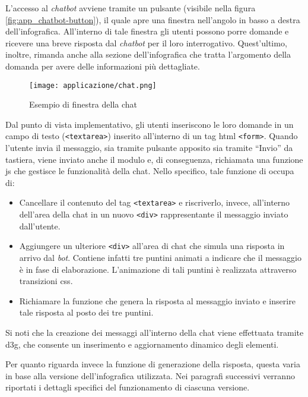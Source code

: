 L'accesso al \emph{chatbot} avviene tramite un pulsante (visibile nella figura \ref{fig:app_chatbot-button}), il quale apre una finestra nell'angolo in basso a destra dell'infografica. 
All'interno di tale finestra gli utenti possono porre domande e ricevere una breve risposta dal \emph{chatbot} per il loro interrogativo. Quest'ultimo, inoltre, rimanda anche alla sezione 
dell'infografica che tratta l'argomento della domanda per avere delle informazioni più dettagliate.
\begin{figure}[H] 
    \centering 
    \texttt{[image: applicazione/chat.png]} 
    \caption{Esempio di finestra della chat}
    \label{fig:app_chat}
\end{figure}

Dal punto di vista implementativo, gli utenti inseriscono le loro domande in un campo di testo (\texttt{<textarea>}) inserito all'interno di un tag \gls{html} \texttt{<form>}. 
Quando l'utente invia il messaggio, sia tramite pulsante apposito sia tramite ``Invio'' da tastiera, 
viene inviato anche il modulo e, di conseguenza, richiamata una funzione \gls{js} che gestisce le funzionalità della chat.
Nello specifico, tale funzione di occupa di:
\begin{itemize}
    \item Cancellare il contenuto del tag \texttt{<textarea>} e riscriverlo, invece, all'interno dell'area della chat in un nuovo \texttt{<div>} rappresentante il 
    messaggio inviato dall'utente.
    \item Aggiungere un ulteriore \texttt{<div>} all'area di chat che simula una risposta in arrivo dal \emph{bot}. Contiene infatti tre puntini animati a indicare che il messaggio è in fase 
    di elaborazione. L'animazione di tali puntini è realizzata attraverso transizioni \gls{css}.
    \item Richiamare la funzione che genera la risposta al messaggio inviato e inserire tale risposta al posto dei tre puntini.
\end{itemize}
Si noti che la creazione dei messaggi all'interno della chat viene effettuata tramite \gls{d3g}, che consente un inserimento e aggiornamento dinamico degli elementi. 

Per quanto riguarda invece la funzione di generazione della risposta, questa varia in base alla versione dell'infografica utilizzata. Nei paragrafi successivi verranno riportati i dettagli specifici del funzionamento di ciascuna versione.

